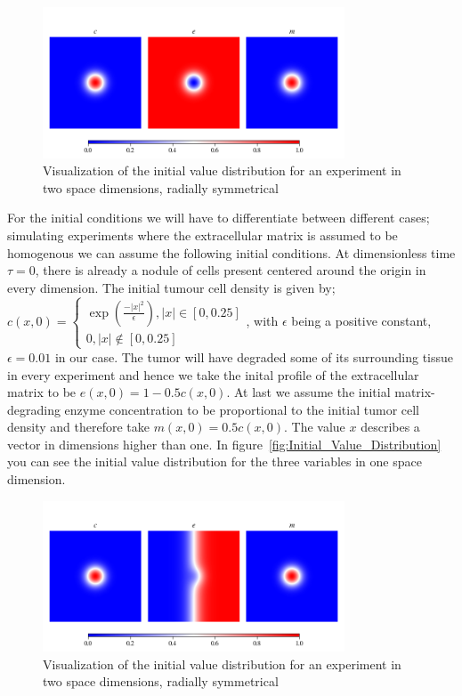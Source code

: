 \begin{figure}[h]
    \centering
    \label{fig:Initial_Value_Distribution}
    \includegraphics[width=0.8\textwidth]{resources/images/2D_initial_conditions_homogenous_ECM.png}
    \caption{Visualization of the initial value distribution for an experiment in two space dimensions, radially symmetrical}
    \label{fig:2D_homogenous_ECM_initial}
\end{figure}
For the initial conditions we will have to differentiate between different cases; simulating experiments where the extracellular matrix is assumed to be homogenous we can assume the following initial conditions. At dimensionless time $\tau = 0$, there is already a nodule of cells present centered around the origin in every dimension. The initial tumour cell density is given by;  
$c(x,0)=
\begin{cases}
\exp(\frac{-|x|^2}{\epsilon}), |x| \in [0, 0.25]\\
0, |x| \notin [0,0.25]
\end{cases}
$, with $\epsilon$ being a positive constant, $\epsilon=0.01$ in our case. The tumor will have degraded some of its surrounding tissue in every experiment and hence we take the inital profile of the extracellular matrix to be $e(x,0) = 1 - 0.5 c(x,0)$. At last we assume the initial matrix-degrading enzyme concentration to be proportional to the initial tumor cell density and therefore take $m(x,0) = 0.5 c(x,0)$. The value $x$ describes a vector in dimensions higher than one. In figure~\ref{fig:Initial_Value_Distribution} you can see the initial value distribution for the three variables in one space dimension. \newline 
\begin{figure}[h]
    \centering
    \label{fig:Initial_Value_Distribution}
    \includegraphics[width=0.8\textwidth]{resources/images/2D_initial_conditions_heterogenous_ECM.png}
    \caption{Visualization of the initial value distribution for an experiment in two space dimensions, radially symmetrical}
    \label{fig:2D_heterogenous_ECM_initial}
\end{figure}
